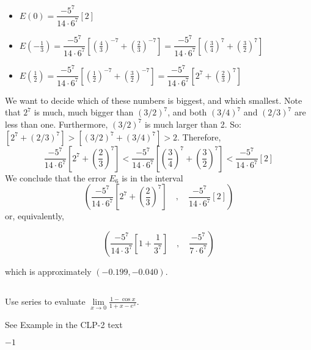 \begin{solution}
\begin{itemize}
	\item $E(0)=\dfrac{-5^7}{14\cdot 6^7}[2]$
	\item $E\left(-\frac{1}{3}\right)=\dfrac{-5^7}{14\cdot 6^7}\left[\left(\frac43 \right)^{-7}+\left(\frac23 \right)^{-7} \right]=\dfrac{-5^7}{14\cdot 6^7}\left[\left(\frac34 \right)^{7}+\left(\frac32 \right)^{7} \right]$
	\item $E\left(\frac{1}{2}\right)=\dfrac{-5^7}{14\cdot 6^7}\left[\left(\frac12 \right)^{-7}+\left(\frac32 \right)^{-7} \right]=\dfrac{-5^7}{14\cdot 6^7}\left[2^7+\left(\frac23 \right)^{7} \right]$
\end{itemize}
We want to decide which of these numbers is biggest, and which smallest. Note that $2^7$ is much, much bigger than $(3/2)^7$, and both $(3/4)^7$ and $(2/3)^7$ are less than one. Furthermore, $(3/2)^7$ is much larger than 2. So: $\left[2^7+(2/3)^7\right]>\left[(3/2)^7+(3/4)^7\right]>2.$ Therefore,
\[\dfrac{-5^7}{14\cdot 6^7}\left[2^7+\left(\frac23 \right)^{7} \right]<\dfrac{-5^7}{14\cdot 6^7}\left[\left(\frac34 \right)^{7}+\left(\frac32 \right)^{7} \right]<\dfrac{-5^7}{14\cdot 6^7}[2]\]
We conclude that the error $E_6$ is in the interval
\[\left(\dfrac{-5^7}{14\cdot 6^7}\left[2^7+\left(\frac23 \right)^{7} \right]\quad,\quad \dfrac{-5^7}{14\cdot 6^7} [2]\right)\]
or, equivalently,

\[\left(\dfrac{-5^7}{14\cdot 3^7}\left[1+\frac{1}{3^7} \right]\quad,\quad \dfrac{-5^7}{7\cdot 6^7} \right)\]

which is approximately $\left(-0.199, -0.040\right)$.
\end{solution}



\subsection*{\Application}


\begin{Mquestion}[2014A]
Use series to evaluate
$\displaystyle \lim\limits_{x\rightarrow 0}\frac{1-\cos x}{1+x-e^x}$.
\end{Mquestion}

\begin{hint}
See Example  in the
CLP-2 text
\end{hint}

\begin{answer}
$-1$
\end{answer}

